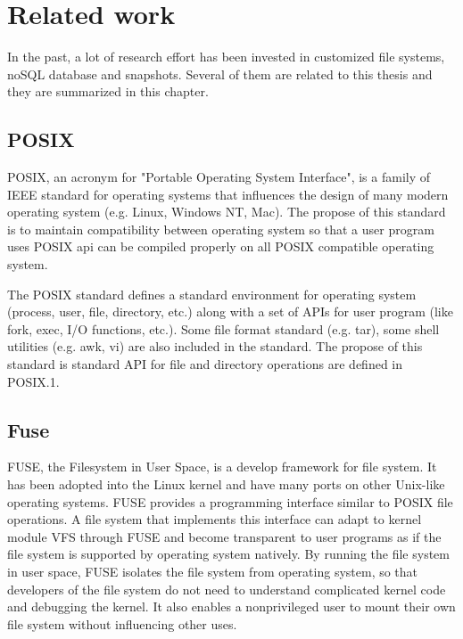 \chapter{Related work}
\label{chap:related_work}

    In the past, a lot of research eﬀort has been invested in customized file systems, noSQL database and snapshots. Several of them are related to this thesis and they are summarized in this chapter.

\section{POSIX}

    POSIX, an acronym for "Portable Operating System Interface", is a family of IEEE standard for operating systems that influences the design of many modern operating system (e.g. Linux, Windows NT, Mac). The propose of this standard is to maintain compatibility between operating system so that a user program uses POSIX api can be compiled properly on all POSIX compatible operating system.

    The POSIX standard defines a standard environment for operating system (process, user, file, directory, etc.) along with a set of APIs for user program (like fork, exec, I/O functions, etc.). Some file format standard (e.g. tar), some shell utilities (e.g. awk, vi) are also included in the standard. The propose of this standard is standard API for file and directory operations are defined in POSIX.1. 

\section{Fuse}

	FUSE, the Filesystem in User Space, is a develop framework for file system.  It has been adopted into the Linux kernel and have many ports on other Unix-like operating systems. FUSE provides a programming interface similar to POSIX file operations. A file system that implements this interface can adapt to kernel module VFS through FUSE and become transparent to user programs as if the file system is supported by operating system natively. By running the file system in user space, FUSE isolates the file system from operating system, so that developers of the file system do not need to understand complicated kernel code and debugging the kernel. It also enables a nonprivileged user to mount their own file system without influencing other uses.

